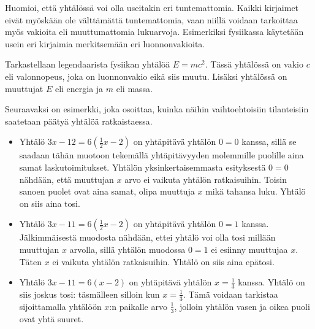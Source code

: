 Huomioi, että yhtälössä voi olla useitakin eri tuntemattomia. Kaikki kirjaimet eivät myöskään ole välttämättä tuntemattomia, vaan niillä voidaan tarkoittaa myös vakioita eli muuttumattomia lukuarvoja. Esimerkiksi fysiikassa käytetään usein eri kirjaimia merkitsemään eri luonnonvakioita.


\begin{esimerkki}
 Tarkastellaan legendaarista fysiikan yhtälöä $E=mc^2$. Tässä yhtälössä on vakio $c$ eli valonnopeus, joka on luonnonvakio eikä siis muutu. Lisäksi yhtälössä on muuttujat $E$ eli energia ja $m$ eli massa.
\end{esimerkki}

Seuraavaksi on esimerkki, joka osoittaa, kuinka näihin vaihtoehtoisiin tilanteisiin saatetaan päätyä yhtälöä ratkaistaessa.




\begin{esimerkki}
	\begin{itemize}
		\item{Yhtälö $3x-12=6(\frac{1}{2}x-2)$ on yhtäpitävä yhtälön $0=0$ kanssa, sillä se saadaan tähän muotoon 
		tekemällä yhtäpitävyyden molemmille puolille aina samat laskutoimitukset. Yhtälön yksinkertaisemmasta esityksestä $0=0$ nähdään, että muuttujan $x$ 
		arvo ei vaikuta yhtälön ratkaisuihin. Toisin sanoen puolet ovat aina samat, olipa muuttuja $x$ mikä tahansa luku. Yhtälö on siis aina tosi.}
		\item{Yhtälö $3x-11=6(\frac{1}{2}x-2)$ on yhtäpitävä yhtälön $0=1$ kanssa. Jälkimmäisestä muodosta nähdään, ettei yhtälö voi olla tosi millään
		muuttujan $x$ arvolla, sillä yhtälön muodossa $0=1$ ei esiinny muuttujaa $x$. Täten $x$ ei vaikuta yhtälön ratkaisuihin. 
		Yhtälö on siis aina epätosi.}
		\item{Yhtälö $3x-11=6(x-2)$ on yhtäpitävä yhtälön $x=\frac{1}{3}$ kanssa. Yhtälö on siis joskus tosi: täsmälleen silloin kun $x=\frac{1}{3}$.
		Tämä voidaan tarkistaa sijoittamalla yhtälöön $x$:n paikalle arvo $\frac{1}{3}$, jolloin yhtälön vasen ja oikea puoli ovat yhtä suuret.}
	\end{itemize}

\end{esimerkki}

